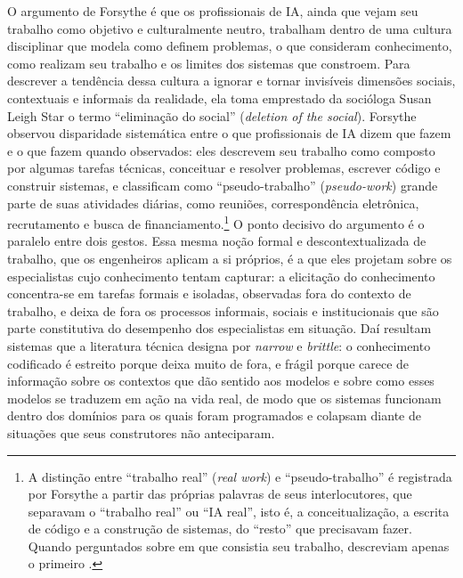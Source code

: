 O argumento de Forsythe é que os profissionais de IA, ainda que vejam seu trabalho como objetivo e culturalmente neutro, trabalham dentro de uma cultura disciplinar que modela como definem problemas, o que consideram conhecimento, como realizam seu trabalho e os limites dos sistemas que constroem. Para descrever a tendência dessa cultura a ignorar e tornar invisíveis dimensões sociais, contextuais e informais da realidade, ela toma emprestado da socióloga Susan Leigh Star o termo \enquote{eliminação do social} (\textit{deletion of the social}). Forsythe observou disparidade sistemática entre o que profissionais de IA dizem que fazem e o que fazem quando observados: eles descrevem seu trabalho como composto por algumas tarefas técnicas, conceituar e resolver problemas, escrever código e construir sistemas, e classificam como \enquote{pseudo-trabalho} (\textit{pseudo-work}) grande parte de suas atividades diárias, como reuniões, correspondência eletrônica, recrutamento e busca de financiamento.\footnote{A distinção entre \enquote{trabalho real} (\textit{real work}) e \enquote{pseudo-trabalho} é registrada por Forsythe a partir das próprias palavras de seus interlocutores, que separavam o \enquote{trabalho real} ou \enquote{IA real}, isto é, a conceitualização, a escrita de código e a construção de sistemas, do \enquote{resto} que precisavam fazer. Quando perguntados sobre em que consistia seu trabalho, descreviam apenas o primeiro \parencite{Forsythe2001}.} O ponto decisivo do argumento é o paralelo entre dois gestos. Essa mesma noção formal e descontextualizada de trabalho, que os engenheiros aplicam a si próprios, é a que eles projetam sobre os especialistas cujo conhecimento tentam capturar: a elicitação do conhecimento concentra-se em tarefas formais e isoladas, observadas fora do contexto de trabalho, e deixa de fora os processos informais, sociais e institucionais que são parte constitutiva do desempenho dos especialistas em situação. Daí resultam sistemas que a literatura técnica designa por \textit{narrow} e \textit{brittle}: o conhecimento codificado é estreito porque deixa muito de fora, e frágil porque carece de informação sobre os contextos que dão sentido aos modelos e sobre como esses modelos se traduzem em ação na vida real, de modo que os sistemas funcionam dentro dos domínios para os quais foram programados e colapsam diante de situações que seus construtores não anteciparam.

